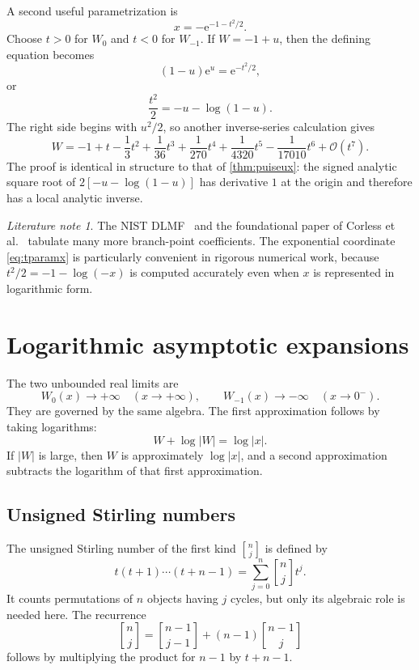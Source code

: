\documentclass[11pt]{article}
\theoremstyle{remark}
\newtheorem{literaturenote}[theorem]{Literature note}
\newcommand{\Wz}{W_0}
\newcommand{\Wm}{W_{-1}}
\newcommand{\ee}{\mathrm e}
\newcommand{\bigO}{\mathcal O}
\newcommand{\stirling}[2]{\genfrac{[}{]}{0pt}{}{#1}{#2}}
\newcommand{\abs}[1]{\left|#1\right|}
\begin{document}
A second useful parametrization is
\begin{equation}\label{eq:tparamx}
       x=-\ee^{-1-t^2/2}.
\end{equation}
Choose \(t>0\) for \(W_0\) and \(t<0\) for \(W_{-1}\).  If
\(W=-1+u\), then the defining equation becomes
\[
       (1-u)\ee^u=\ee^{-t^2/2},
\]
or
\begin{equation}\label{eq:t-u-relation}
       \frac{t^2}{2}=-u-\log(1-u).
\end{equation}
The right side begins with \(u^2/2\), so another inverse-series calculation
gives
\begin{equation}\label{eq:tseries}
 W=-1+t-\frac13t^2+\frac1{36}t^3+\frac1{270}t^4
      +\frac1{4320}t^5-\frac1{17010}t^6+\bigO(t^7).
\end{equation}
The proof is identical in structure to that of
\cref{thm:puiseux}: the signed analytic square root of
\(2[-u-\log(1-u)]\) has derivative \(1\) at the origin and therefore has a
local analytic inverse.

\begin{literaturenote}
The NIST DLMF~\cite{dlmf} and the foundational paper of Corless et
al.~\cite{corless1996} tabulate many more branch-point coefficients.  The exponential coordinate
\eqref{eq:tparamx} is particularly convenient in rigorous numerical work,
because \(t^2/2=-1-\log(-x)\) is computed accurately even when \(x\) is
represented in logarithmic form.
\end{literaturenote}

\section{Logarithmic asymptotic expansions}\label{sec:asymptotics}

The two unbounded real limits are
\[
       \Wz(x)\longrightarrow+\infty\quad(x\to+\infty),
       \qquad
       \Wm(x)\longrightarrow-\infty\quad(x\to0^-).
\]
They are governed by the same algebra.  The first approximation follows by
taking logarithms:
\[
       W+\log\abs W=\log\abs x.
\]
If \(\abs W\) is large, then \(W\) is approximately \(\log\abs x\), and a
second approximation subtracts the logarithm of that first approximation.

\subsection{Unsigned Stirling numbers}

The unsigned Stirling number of the first kind
\(\stirling{n}{j}\) is defined by
\begin{equation}\label{eq:stirling-def}
 t(t+1)\cdots(t+n-1)
 =\sum_{j=0}^n\stirling{n}{j}t^j.
\end{equation}
It counts permutations of \(n\) objects having \(j\) cycles, but only its
algebraic role is needed here.  The recurrence
\begin{equation}\label{eq:stirling-rec}
 \stirling{n}{j}
 =\stirling{n-1}{j-1}+(n-1)\stirling{n-1}{j}
\end{equation}
follows by multiplying the product for \(n-1\) by \(t+n-1\).
\end{document}

